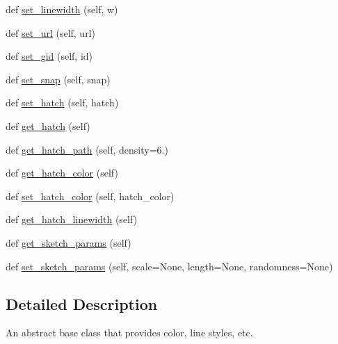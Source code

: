 \begin{DoxyCompactItemize}
\item 
def \hyperlink{classmatplotlib_1_1backend__bases_1_1GraphicsContextBase_a787faeeefc81acf078366b1766ae739a}{set\+\_\+linewidth} (self, w)
\item 
def \hyperlink{classmatplotlib_1_1backend__bases_1_1GraphicsContextBase_a43a2989f13293349c40e7810b8681ee2}{set\+\_\+url} (self, url)
\item 
def \hyperlink{classmatplotlib_1_1backend__bases_1_1GraphicsContextBase_ad9cd0f6ca6728d2b6ef858430c4d8988}{set\+\_\+gid} (self, id)
\item 
def \hyperlink{classmatplotlib_1_1backend__bases_1_1GraphicsContextBase_a619053752484321bb0e2c8fb17efd709}{set\+\_\+snap} (self, snap)
\item 
def \hyperlink{classmatplotlib_1_1backend__bases_1_1GraphicsContextBase_a4e1e796098eca539cc38f3791ade58cb}{set\+\_\+hatch} (self, hatch)
\item 
def \hyperlink{classmatplotlib_1_1backend__bases_1_1GraphicsContextBase_a3693c84835ec1c0fd919de79f285b33f}{get\+\_\+hatch} (self)
\item 
def \hyperlink{classmatplotlib_1_1backend__bases_1_1GraphicsContextBase_a7b9e1b58b52a70f3b09ee374dfb3610b}{get\+\_\+hatch\+\_\+path} (self, density=6.)
\item 
def \hyperlink{classmatplotlib_1_1backend__bases_1_1GraphicsContextBase_a4786258de0828dc733fb1f013322763d}{get\+\_\+hatch\+\_\+color} (self)
\item 
def \hyperlink{classmatplotlib_1_1backend__bases_1_1GraphicsContextBase_a263081aa2bcf314b6bd9832ed17e89a6}{set\+\_\+hatch\+\_\+color} (self, hatch\+\_\+color)
\item 
def \hyperlink{classmatplotlib_1_1backend__bases_1_1GraphicsContextBase_a40363c9bbd45eeaab00897431b1effbd}{get\+\_\+hatch\+\_\+linewidth} (self)
\item 
def \hyperlink{classmatplotlib_1_1backend__bases_1_1GraphicsContextBase_aa72d7fcd0e6ac1e14aef720f055ae476}{get\+\_\+sketch\+\_\+params} (self)
\item 
def \hyperlink{classmatplotlib_1_1backend__bases_1_1GraphicsContextBase_aecea27bac7123a4a7292970317f5235c}{set\+\_\+sketch\+\_\+params} (self, scale=None, length=None, randomness=None)
\end{DoxyCompactItemize}


\subsection{Detailed Description}
\begin{DoxyVerb}An abstract base class that provides color, line styles, etc.\end{DoxyVerb}
 


